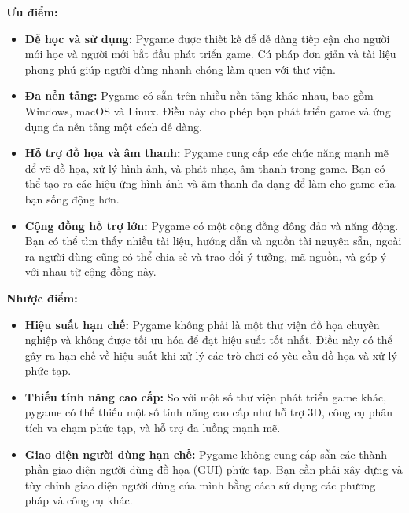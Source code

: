 \documentclass[a4paper]{article}
\begin{document}
\begin{par}
\textbf{Ưu điểm:}
\begin{itemize}
    \item \textbf{Dễ học và sử dụng: } Pygame được thiết kế để dễ dàng tiếp cận cho người mới học và người mới bắt đầu phát triển game. Cú pháp đơn giản và tài liệu phong phú giúp người dùng nhanh chóng làm quen với thư viện.
    \item \textbf{Đa nền tảng:} Pygame có sẵn trên nhiều nền tảng khác nhau, bao gồm Windows, macOS và Linux. Điều này cho phép bạn phát triển game và ứng dụng đa nền tảng một cách dễ dàng.
    \item \textbf{Hỗ trợ đồ họa và âm thanh:} Pygame cung cấp các chức năng mạnh mẽ để vẽ đồ họa, xử lý hình ảnh, và phát nhạc, âm thanh trong game. Bạn có thể tạo ra các hiệu ứng hình ảnh và âm thanh đa dạng để làm cho game của bạn sống động hơn.
    \item \textbf{Cộng đồng hỗ trợ lớn:} Pygame có một cộng đồng đông đảo và năng động. Bạn có thể tìm thấy nhiều tài liệu, hướng dẫn và nguồn tài nguyên sẵn, ngoài ra người dùng cũng có thể chia sẻ và trao đổi ý tưởng, mã nguồn, và góp ý với nhau từ cộng đồng này.
\end{itemize}
\vspace{10pt}

\textbf{Nhược điểm:}
    \begin{itemize}
    \item \textbf{Hiệu suất hạn chế:} Pygame không phải là một thư viện đồ họa chuyên nghiệp và không được tối ưu hóa để đạt hiệu suất tốt nhất. Điều này có thể gây ra hạn chế về hiệu suất khi xử lý các trò chơi có yêu cầu đồ họa và xử lý phức tạp.
    \item \textbf{Thiếu tính năng cao cấp:} So với một số thư viện phát triển game khác, pygame có thể thiếu một số tính năng cao cấp như hỗ trợ 3D, công cụ phân tích va chạm phức tạp, và hỗ trợ đa luồng mạnh mẽ.
    \item \textbf{Giao diện người dùng hạn chế:} Pygame không cung cấp sẵn các thành phần giao diện người dùng đồ họa (GUI) phức tạp. Bạn cần phải xây dựng và tùy chỉnh giao diện người dùng của mình bằng cách sử dụng các phương pháp và công cụ khác.
\end{itemize}
\end{par}
\end{document}
